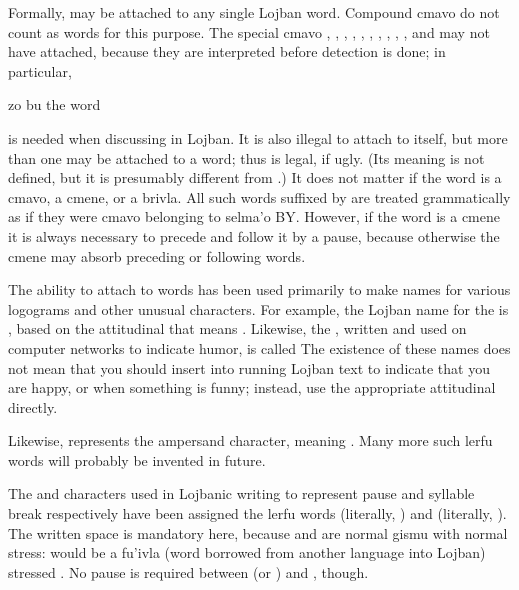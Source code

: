 Formally,  may be attached to any single Lojban word.
    Compound cmavo do not count as words for this purpose. The
    special cmavo , , , , ,
    , , , , , and  may
    not have  attached, because they are interpreted before
     detection is done; in particular,
\begin{example}
zo bu\n
the word 
\end{example}

{\noindent}is needed when discussing  in Lojban. It is also illegal
    to attach  to itself, but more than one  may be
    attached to a word; thus  is legal, if ugly. (Its
    meaning is not defined, but it is presumably different from
    .) It does not matter if the word is a cmavo, a cmene,
    or a brivla. All such words suffixed by  are treated
    grammatically as if they were cmavo belonging to selma'o BY.
    However, if the word is a cmene it is always necessary to
    precede and follow it by a pause, because otherwise the cmene
    may absorb preceding or following words. 

The ability to attach  to words has been used
    primarily to make names for various logograms and other unusual
    characters. For example, the Lojban name for the 
    is , based on the attitudinal  that means
    . Likewise, the , written \q{:-)}
    and used on computer networks to indicate humor, is called
     The existence of these names does not mean that you
    should insert  into running Lojban text to indicate
    that you are happy, or  when something is funny;
    instead, use the appropriate attitudinal directly.

Likewise,  represents the ampersand character,
     meaning .
    Many more such lerfu words will probably be invented in
    future.

The  and \q{,} characters used in Lojbanic writing to
    represent pause and syllable break respectively have been
    assigned the lerfu words  (literally, )
    and  (literally, ). The written
    space is mandatory here, because  and  are
    normal gismu with normal stress:  would be a fu'ivla
    (word borrowed from another language into Lojban) stressed
    . No pause is required between  (or
    ) and , though.



